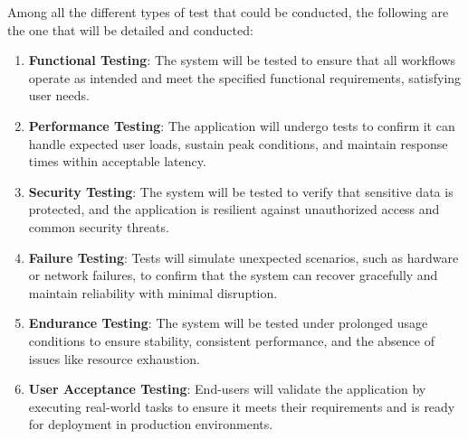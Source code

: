\par Among all the different types of test that could be conducted, the following are the one that will be detailed and 
conducted:

\begin{enumerate}
    \item \textbf{Functional Testing}: The system will be tested to ensure that all workflows operate as intended and
          meet the specified functional requirements, satisfying user needs.
    \item \textbf{Performance Testing}: The application will undergo tests to confirm it can handle expected user
          loads, sustain peak conditions, and maintain response times within acceptable 
          latency.
    \item \textbf{Security Testing}: The system will be tested to verify that sensitive data is protected, and the
          application is resilient against unauthorized access and common security threats.
    \item \textbf{Failure Testing}: Tests will simulate unexpected scenarios, such as hardware or network failures, to
          confirm that the system can recover gracefully and maintain reliability with 
          minimal disruption.
    \item \textbf{Endurance Testing}: The system will be tested under prolonged usage conditions to ensure stability,
          consistent performance, and the absence of issues like resource exhaustion.
    \item \textbf{User Acceptance Testing}: End-users will validate the application by executing real-world tasks to
          ensure it meets their requirements and is ready for deployment in production environments.
\end{enumerate}
